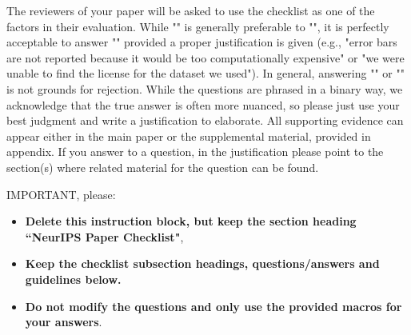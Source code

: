 \documentclass{article}
\begin{document}
The reviewers of your paper will be asked to use the checklist as one of the factors in their evaluation. While "\answerYes{}" is generally preferable to "\answerNo{}", it is perfectly acceptable to answer "\answerNo{}" provided a proper justification is given (e.g., "error bars are not reported because it would be too computationally expensive" or "we were unable to find the license for the dataset we used"). In general, answering "\answerNo{}" or "\answerNA{}" is not grounds for rejection. While the questions are phrased in a binary way, we acknowledge that the true answer is often more nuanced, so please just use your best judgment and write a justification to elaborate. All supporting evidence can appear either in the main paper or the supplemental material, provided in appendix. If you answer \answerYes{} to a question, in the justification please point to the section(s) where related material for the question can be found.

IMPORTANT, please:
\begin{itemize}
    \item {\bf Delete this instruction block, but keep the section heading ``NeurIPS Paper Checklist"},
    \item  {\bf Keep the checklist subsection headings, questions/answers and guidelines below.}
    \item {\bf Do not modify the questions and only use the provided macros for your answers}.
\end{itemize} 
 

\end{document}
